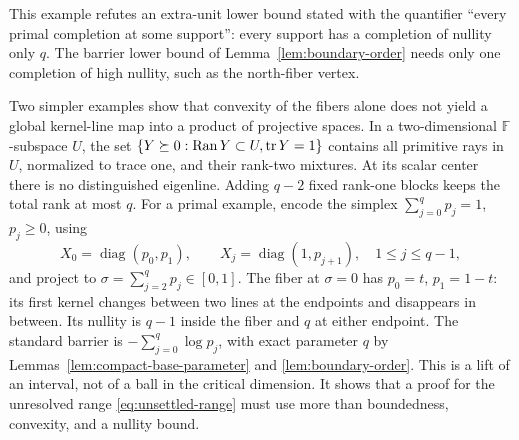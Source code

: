 This example refutes an extra-unit lower bound stated with the
quantifier ``every primal completion at some support'': every support
has a completion of nullity only $q$. The barrier lower bound of
Lemma~\ref{lem:boundary-order} needs only one completion of high
nullity, such as the north-fiber vertex.

Two simpler examples show that convexity of the fibers alone does not
yield a global kernel-line map into a product of projective spaces. In a two-dimensional $\mathbb F$-subspace
$U$, the set $\{Y\succeq0:\operatorname{Ran}Y\subset U,\operatorname{tr} Y=1\}$
contains all primitive rays in $U$, normalized to trace one, and their
rank-two mixtures. At its
scalar center there is no distinguished eigenline. Adding $q-2$ fixed
rank-one blocks keeps the total rank at most $q$.
For a primal example, encode the simplex
$\sum_{j=0}^q p_j=1$, $p_j\geq0$, using
\[
 X_0=\operatorname{diag}(p_0,p_1),\qquad
 X_j=\operatorname{diag}(1,p_{j+1}),\quad1\leq j\leq q-1,
\]
and project to $\sigma=\sum_{j=2}^qp_j\in[0,1]$.
The fiber at $\sigma=0$ has $p_0=t$, $p_1=1-t$: its first kernel
changes between two lines at the endpoints and disappears in between.
Its nullity is $q-1$ inside the fiber and $q$ at either endpoint.
The standard barrier is $-\sum_{j=0}^q\log p_j$, with exact parameter
$q$ by Lemmas~\ref{lem:compact-base-parameter} and
\ref{lem:boundary-order}. This is a lift of an interval, not of a ball
in the critical dimension. It shows that a proof for the unresolved
range \eqref{eq:unsettled-range} must use more than boundedness,
convexity, and a nullity bound.
